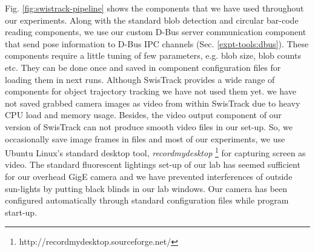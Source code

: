 Fig. \ref{fig:swistrack-pipeline} shows the components that we have used throughout our experiments. Along with the standard blob detection and circular bar-code reading components, we use our custom D-Bus server communication component that send pose information to D-Bus IPC channels (Sec. \ref{expt-tools:dbus}). These components require a little tuning of few parameters, e.g. blob size, blob counts etc. They can be done once and saved in component configuration files for loading them in next runs. Although SwisTrack provides a wide range of components for object trajectory tracking we have not used them yet. we have not saved grabbed camera images as video from within SwisTrack due to heavy CPU load and memory usage. Besides, the video output component of our version of SwisTrack can not produce smooth video files in our set-up. So, we occasionally save image frames in files and most of our experiments, we use Ubuntu Linux's standard desktop  tool, {\em recordmydesktop} \footnote{http://recordmydesktop.sourceforge.net/} for capturing screen as video. The standard fluorescent lightings set-up of our lab has seemed sufficient for our overhead GigE camera and we have prevented interferences of outside sun-lights by putting black blinds in our lab windows. Our camera has been configured automatically through standard configuration files while program start-up.
